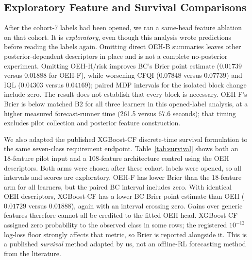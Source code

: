 \subsection{Exploratory Feature and Survival Comparisons}
\label{sec:exploratory-comparisons}
After the cohort-7 labels had been opened, we ran a same-head feature ablation on that cohort. It is \emph{exploratory}, even though this analysis wrote predictions before reading the labels again. Omitting direct OEH-B summaries leaves other posterior-dependent descriptors in place and is not a complete no-posterior experiment. Omitting OEH-H/risk improves BC's Brier point estimate ($0.01739$ versus $0.01888$ for OEH-F), while worsening CFQI ($0.07848$ versus $0.07739$) and IQL ($0.04303$ versus $0.04169$); paired MDP intervals for the isolated block change include zero. The result does not establish that every block is necessary. OEH-F's Brier is below matched B2 for all three learners in this opened-label analysis, at a higher measured forecast-runner time (261.5 versus 67.6 seconds); that timing excludes pilot collection and posterior feature construction.

We also adapted the published XGBoost-CF discrete-time survival formulation \cite{kim2026survival} to the same seven-class requirement endpoint. Table~\ref{tab:survival} shows both an 18-feature pilot input and a 108-feature architecture control using the OEH descriptors. Both arms were chosen after these cohort labels were opened, so all intervals and scores are exploratory. OEH-F has lower Brier than the 18-feature arm for all learners, but the paired BC interval includes zero. With identical OEH descriptors, XGBoost-CF has a lower BC Brier point estimate than OEH ($0.01729$ versus $0.01888$), again with an interval crossing zero. Gains over generic features therefore cannot all be credited to the fitted OEH head. XGBoost-CF assigned zero probability to the observed class in some rows; the registered $10^{-12}$ log-loss floor strongly affects that metric, so Brier is reported alongside it. This is a published \emph{survival} method adapted by us, not an offline-RL forecasting method from the literature.

